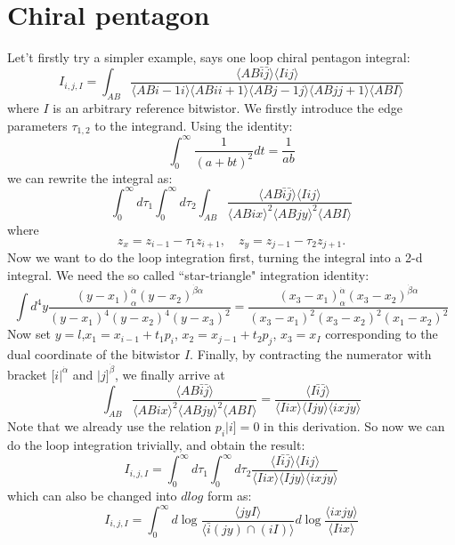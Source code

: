\documentclass[10pt]{article}
\def\<{\langle}
\def\>{\rangle}
\begin{document}
\section{Chiral pentagon}
Let't firstly try a simpler example, says one loop chiral pentagon integral:
\begin{equation}
I_{i,j,I}=\int_{AB}\frac{\<AB\bar{i}\bar{j}\>\<Iij\>}{\<ABi-1i\>\<ABii+1\>\<ABj-1j\>\<ABjj+1\>\<ABI\>}
\end{equation}
where $I$ is an arbitrary reference bitwistor. We firstly introduce the edge parameters $\tau_{1,2}$ to the integrand. Using the identity:
\begin{equation}
\int_0^{\infty}\frac1{(a+b t)^2}dt=\frac1{ab}
\end{equation}
we can rewrite the integral as:
\begin{equation}
\int_0^{\infty}d\tau_1\int_0^{\infty}d\tau_2\int_{AB}\frac{\<AB\bar{i}\bar{j}\>\<Iij\>}{\<ABix\>^2\<ABjy\>^2\<ABI\>}
\end{equation}
where 
\[
    z_x=z_{i-1}-\tau_1 z_{i+1},\quad z_y=z_{j-1}-\tau_2 z_{j+1}.
\]
Now we want to do the loop integration first, turning the integral into a 2-d integral. We need the so called ``star-triangle" integration identity:
\begin{equation}
\int d^4y\frac{(y-x_1)^{\dot\alpha}_{\alpha}(y-x_2)^{\dot\beta\alpha}}{(y-x_1)^4(y-x_2)^4(y-x_3)^2}=\frac{(x_3-x_1)^{\dot\alpha}_{\alpha}(x_3-x_2)^{\dot\beta\alpha}}{(x_3-x_1)^2(x_3-x_2)^2(x_1-x_2)^2}
\end{equation}
Now set $y=l$,$x_1=x_{i-1}+t_1p_i$, $x_2=x_{j-1}+t_2p_j$, $x_3=x_I$ corresponding to the dual coordinate of the bitwistor $I$. Finally, by contracting the numerator with bracket $[i|^{\dot\alpha}$ and $|j]^{\dot\beta}$, we finally arrive at
\begin{equation}
\int_{AB}\frac{\<AB\bar{i}\bar{j}\>}{\<ABix\>^2\<ABjy\>^2\<ABI\>}=\frac{\<I\bar{i}\bar{j}\>}{\<Iix\>\<Ijy\>\<ixjy\>}
\end{equation}
Note that we already use the relation $p_i|i]=0$ in this derivation. So now we can do the loop integration trivially, and  obtain the result:
\begin{equation}
I_{i,j,I}=\int_0^{\infty}d\tau_1\int_0^{\infty}d\tau_2\frac{\<I\bar{i}\bar{j}\>\<Iij\>}{\<Iix\>\<Ijy\>\<ixjy\>}
\end{equation}
which can also be changed into $dlog$ form as:
\begin{equation}
I_{i,j,I}=\int_0^{\infty}d\log\frac{\<jyI\>}{\<\bar{i}(jy)\cap(iI)\>}d\log\frac{\<ixjy\>}{\<Iix\>}
\end{equation}
\end{document}
